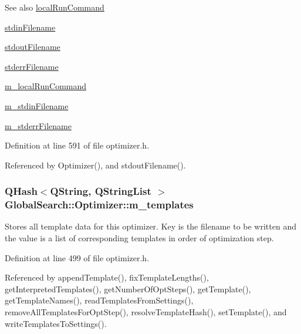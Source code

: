 \begin{DoxySeeAlso}{See also}
\hyperlink{classGlobalSearch_1_1Optimizer_aed5eb285d45a001c9520c2ed3a5b57a1}{local\+Run\+Command} 

\hyperlink{classGlobalSearch_1_1Optimizer_a5964a9b38d3ae90c8ac36a75d3a35832}{stdin\+Filename} 

\hyperlink{classGlobalSearch_1_1Optimizer_a217750aa50431f9948aa8164fb99de0c}{stdout\+Filename} 

\hyperlink{classGlobalSearch_1_1Optimizer_acaa83cc6bf1dcc263b92450b4f8cb652}{stderr\+Filename} 

\hyperlink{classGlobalSearch_1_1Optimizer_a1cdb6b6c5e929e84c834ba93148fb31e}{m\+\_\+local\+Run\+Command} 

\hyperlink{classGlobalSearch_1_1Optimizer_aca91d12d7aecae052d6ab5ae158acec6}{m\+\_\+stdin\+Filename} 

\hyperlink{classGlobalSearch_1_1Optimizer_a75b800a7f90a03d551f6795404d0c8f1}{m\+\_\+stderr\+Filename} 
\end{DoxySeeAlso}


Definition at line 591 of file optimizer.\+h.



Referenced by Optimizer(), and stdout\+Filename().

\hypertarget{classGlobalSearch_1_1Optimizer_aa5892c64826b7cc7a2baa092efc8c66d}{}
\subsubsection[{m\+\_\+templates}]{\setlength{\rightskip}{0pt plus 5cm}Q\+Hash$<$Q\+String, Q\+String\+List $>$ Global\+Search\+::\+Optimizer\+::m\+\_\+templates\hspace{0.3cm}{\ttfamily [protected]}}\label{classGlobalSearch_1_1Optimizer_aa5892c64826b7cc7a2baa092efc8c66d}
Stores all template data for this optimizer. Key is the filename to be written and the value is a list of corresponding templates in order of optimization step. 

Definition at line 499 of file optimizer.\+h.



Referenced by append\+Template(), fix\+Template\+Lengths(), get\+Interpreted\+Templates(), get\+Number\+Of\+Opt\+Steps(), get\+Template(), get\+Template\+Names(), read\+Templates\+From\+Settings(), remove\+All\+Templates\+For\+Opt\+Step(), resolve\+Template\+Hash(), set\+Template(), and write\+Templates\+To\+Settings().

